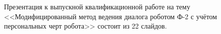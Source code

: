 Презентация к выпускной квалификационной работе на тему <<Модифицированный метод ведения диалога роботом Ф-2 с учётом персональных черт робота>> состоит из 22 слайдов.